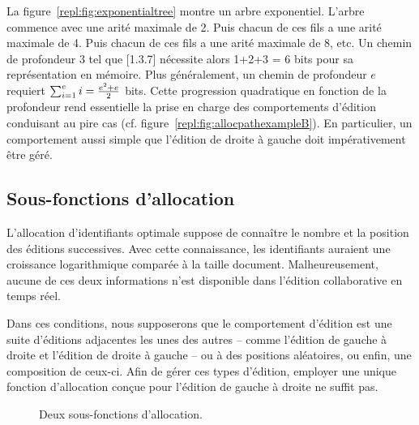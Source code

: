 La figure~\ref{repl:fig:exponentialtree} montre un arbre exponentiel. L'arbre
commence avec une arité maximale de 2. Puis chacun de ces fils a une arité
maximale de 4. Puis chacun de ces fils a une arité maximale de 8, etc. Un chemin
de profondeur 3 tel que [1.3.7] nécessite alors 1+2+3 = 6 bits pour sa
représentation en mémoire.  Plus généralement, un chemin de profondeur $e$
requiert $\textstyle\sum\nolimits_{i=1}^{e}i = {e^2 + e \over{2}}$ bits. Cette
progression quadratique en fonction de la profondeur rend essentielle la prise
en charge des comportements d'édition conduisant au pire cas
(cf. figure~\ref{repl:fig:allocpathexampleB}). En particulier, un comportement
aussi simple que l'édition de droite à gauche doit impérativement être géré.

\subsection{Sous-fonctions d'allocation}
\label{repl:subsec:suballocation}

L'allocation d'identifiants optimale suppose de connaître le nombre et la
position des éditions successives. Avec cette connaissance, les identifiants
auraient une croissance logarithmique comparée à la taille
document. Malheureusement, aucune de ces deux informations n'est disponible dans
l'édition collaborative en temps réel.

Dans ces conditions, nous supposerons que le comportement d'édition est une
suite d'éditions adjacentes les unes des autres -- comme l'édition de gauche à
droite et l'édition de droite à gauche -- ou à des positions aléatoires, ou
enfin, une composition de ceux-ci. Afin de gérer ces types d'édition, employer
une unique fonction d'allocation conçue pour l'édition de gauche à droite ne
suffit pas.

\begin{figure}
  \begin{center}
    \hspace{20pt}
    \caption[Deux sous-fonctions d'allocation]
    {\label{repl:fig:suballocation}Deux sous-fonctions d'allocation.}
  \end{center}
\end{figure}

